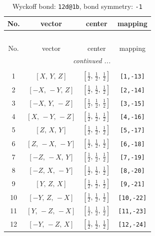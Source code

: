 \documentclass[fleqn,8pt]{jsarticle}
\begin{document}
\begin{longtable}{cccc}
\caption{Wyckoff bond: {\tt 12d@1b}, bond symmetry: {\tt -1}}
 \\
 \hline \hline
No. & vector & center & mapping \\ \hline \endfirsthead

\multicolumn{3}{l}{\tablename\ \thetable{}} \\
 \hline \hline
No. & vector & center & mapping \\ \hline \endhead

 \hline \hline
\multicolumn{3}{r}{\footnotesize\it continued ...} \\ \endfoot

 \hline \hline
\multicolumn{3}{r}{} \\ \endlastfoot

1 & $\left[ X,\, Y,\, Z \right]$ & $\left[ \frac{1}{2},\, \frac{1}{2},\, \frac{1}{2} \right]$ & {\tt [1,-13]} \\ \hline
2 & $\left[ - X,\, - Y,\, Z \right]$ & $\left[ \frac{1}{2},\, \frac{1}{2},\, \frac{1}{2} \right]$ & {\tt [2,-14]} \\ \hline
3 & $\left[ - X,\, Y,\, - Z \right]$ & $\left[ \frac{1}{2},\, \frac{1}{2},\, \frac{1}{2} \right]$ & {\tt [3,-15]} \\ \hline
4 & $\left[ X,\, - Y,\, - Z \right]$ & $\left[ \frac{1}{2},\, \frac{1}{2},\, \frac{1}{2} \right]$ & {\tt [4,-16]} \\ \hline
5 & $\left[ Z,\, X,\, Y \right]$ & $\left[ \frac{1}{2},\, \frac{1}{2},\, \frac{1}{2} \right]$ & {\tt [5,-17]} \\ \hline
6 & $\left[ Z,\, - X,\, - Y \right]$ & $\left[ \frac{1}{2},\, \frac{1}{2},\, \frac{1}{2} \right]$ & {\tt [6,-18]} \\ \hline
7 & $\left[ - Z,\, - X,\, Y \right]$ & $\left[ \frac{1}{2},\, \frac{1}{2},\, \frac{1}{2} \right]$ & {\tt [7,-19]} \\ \hline
8 & $\left[ - Z,\, X,\, - Y \right]$ & $\left[ \frac{1}{2},\, \frac{1}{2},\, \frac{1}{2} \right]$ & {\tt [8,-20]} \\ \hline
9 & $\left[ Y,\, Z,\, X \right]$ & $\left[ \frac{1}{2},\, \frac{1}{2},\, \frac{1}{2} \right]$ & {\tt [9,-21]} \\ \hline
10 & $\left[ - Y,\, Z,\, - X \right]$ & $\left[ \frac{1}{2},\, \frac{1}{2},\, \frac{1}{2} \right]$ & {\tt [10,-22]} \\ \hline
11 & $\left[ Y,\, - Z,\, - X \right]$ & $\left[ \frac{1}{2},\, \frac{1}{2},\, \frac{1}{2} \right]$ & {\tt [11,-23]} \\ \hline
12 & $\left[ - Y,\, - Z,\, X \right]$ & $\left[ \frac{1}{2},\, \frac{1}{2},\, \frac{1}{2} \right]$ & {\tt [12,-24]} \\
\end{longtable}
\end{document}
